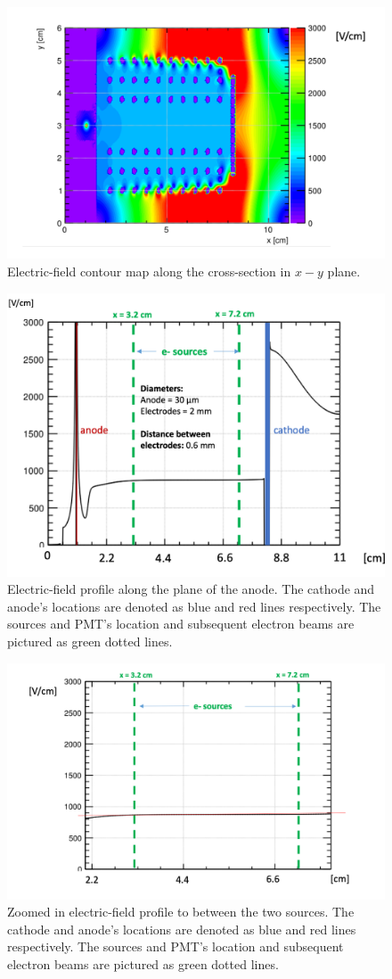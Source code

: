 \begin{figure}[H]
	\centering
	\includegraphics[width=0.7\linewidth]{figures/efield.png}
	\caption{Electric-field contour map along the cross-section in $x-y$ plane.}
	\label{fig:e_map}
\end{figure}
\begin{figure}[H]
	\centering
	\includegraphics[width=0.7\linewidth]{figures/efield_goodsep.png}
	\caption{Electric-field profile along the plane of the anode. The cathode and anode's locations are denoted as blue and red lines respectively. The sources and PMT's location and subsequent electron beams are pictured as green dotted lines.}
	\label{fig:eprof_good}
\end{figure}
\begin{figure}[H]
	\centering
	\includegraphics[width=0.8\linewidth]{figures/efield_zoom.png}
	\caption{Zoomed in electric-field profile to between the two sources. The cathode and anode's locations are denoted as blue and red lines respectively. The sources and PMT's location and subsequent electron beams are pictured as green dotted lines.}
	\label{fig:eprof_goodzoom}
\end{figure}

